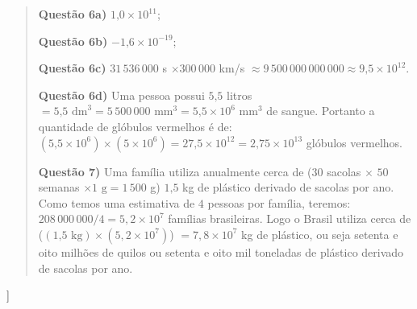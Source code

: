 \begin{quote}

\textbf{Questão 6a)} \(1\text{,}0 \times 10^{11}\);

\textbf{Questão 6b)} \(-1\text{,}6 \times 10^{-19}\);

\textbf{Questão 6c)} \(31\,536\,000\) s \(\times 300\, 000\) km/s \(\approx 9\, 500\, 000\, 000\, 000 \approx 9\text{,}5 \times 10^{12}\).

\textbf{Questão 6d)} Uma pessoa possui \(5\text{,}5\) litros \(= 5\text{,}5 \text{ dm}^{3} = 5\,500\,000 \text{ mm}^3 = 5\text{,}5 \times 10^{6} \text{ mm}^3\) de sangue. Portanto a quantidade de glóbulos vermelhos é de: \((5\text{,}5 \times 10^{6}) \times (5 \times 10^{6}) = 27\text{,}5 \times 10^{12} = 2\text{,}75 \times 10^{13}\) glóbulos vermelhos.

\textbf{Questão 7)} Uma família utiliza anualmente cerca de (\(30\) sacolas \(\times\) \(50\) semanas \(\times 1\text{ g} = 1\,500\) g) \(1\text{,}5\) kg de plástico derivado de sacolas por ano. Como temos uma estimativa de \(4\) pessoas por família, teremos: \(208\,000\,000/4 = 5,2 \times 10^{7}\) famílias brasileiras. Logo o Brasil utiliza cerca de (\((1\text{,}5 \text{ kg}) \times (5,2 \times 10^{7})\)) \(= 7,8 \times 10^{7}\) kg de plástico, ou seja setenta e oito milhões de quilos ou  setenta e oito mil toneladas de plástico derivado de sacolas por ano.
\end{quote}]